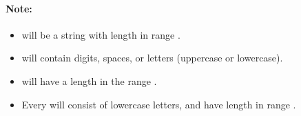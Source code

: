 \paragraph{Note:}

\begin{itemize}
\item {} will be a string with length in range \fcj{[1, 7]}.
\item {} will contain digits, spaces, or letters (uppercase or lowercase).
\item {} will have a length in the range \fcj{[10, 1000]}.
\item Every  will consist of lowercase letters, and have length in range \fcj{[1, 15]}.
\end{itemize}